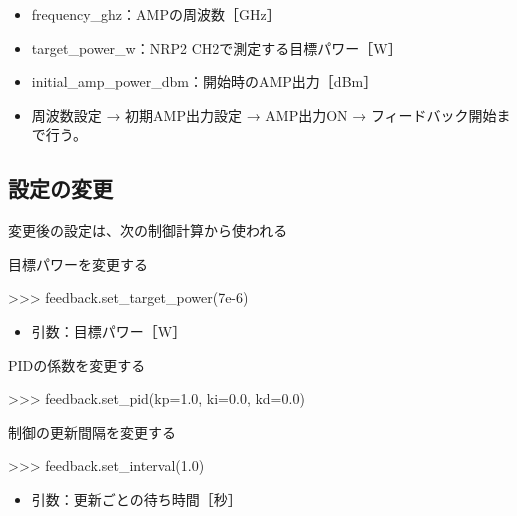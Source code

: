 \documentclass[a4paper,11pt]{ltjsarticle}
\begin{document}
\begin{itemize}

\item frequency\_ghz：AMPの周波数［GHz］

\item target\_power\_w：NRP2 CH2で測定する目標パワー［W］

\item initial\_amp\_power\_dbm：開始時のAMP出力［dBm］

\item 周波数設定 → 初期AMP出力設定 → AMP出力ON → フィードバック開始まで行う。

\end{itemize}

\subsection{設定の変更}

変更後の設定は、次の制御計算から使われる


目標パワーを変更する


\begin{command}

>>> feedback.set_target_power(7e-6)

\end{command}

\begin{itemize}

\item 引数：目標パワー［W］

\end{itemize}

PIDの係数を変更する


\begin{command}

>>> feedback.set_pid(kp=1.0, ki=0.0, kd=0.0)

\end{command}

制御の更新間隔を変更する


\begin{command}

>>> feedback.set_interval(1.0)

\end{command}

\begin{itemize}

\item 引数：更新ごとの待ち時間［秒］

\end{itemize}
\end{document}
